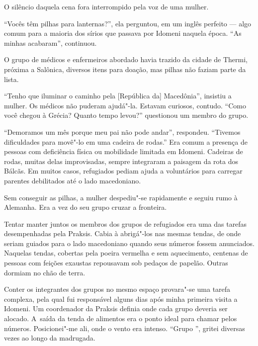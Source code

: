 
O silêncio daquela cena fora interrompido pela voz de uma mulher.

``Vocês têm pilhas para lanternas?'', ela perguntou, em um inglês
perfeito --- algo comum para a maioria dos sírios que passava por
Idomeni naquela época. ``As minhas acabaram'', continuou.

O grupo de médicos e enfermeiros abordado havia trazido da cidade de
Thermi, próxima a Salônica, diversos itens para doação, mas pilhas não faziam parte da lista.

``Tenho que iluminar o caminho pela {[}República da{]} Macedônia'',
insistiu a mulher. Os médicos não puderam ajudá"-la. Estavam curiosos,
contudo. ``Como você chegou à Grécia? Quanto tempo levou?'' questionou
um membro do grupo.

``Demoramos um mês porque meu pai não pode andar'', respondeu.
``Tivemos dificuldades para movê"-lo em uma cadeira de rodas.''
 Era comum a presença de pessoas com deficiência física ou mobilidade limitada em Idomeni.
 Cadeiras de rodas, muitas delas improvisadas, sempre integraram a paisagem da rota dos Bálcãs. Em muitos
casos, refugiados pediam ajuda a voluntários para carregar parentes
debilitados até o lado macedoniano.

Sem conseguir as pilhas, a mulher despediu"-se rapidamente e seguiu rumo
à Alemanha. Era a vez do seu grupo cruzar a fronteira.


Tentar manter juntos os membros dos grupos de refugiados era uma das
tarefas desempenhadas pela Praksis. Cabia à  abrigá"-los nas mesmas
tendas, de onde seriam guiados para o lado macedoniano quando seus
números fossem anunciados. Naquelas tendas, cobertas pela poeira
vermelha e sem aquecimento, centenas de pessoas com feições exaustas
repousavam sob pedaços de papelão. Outras dormiam no chão de terra.

Conter os integrantes dos grupos no mesmo espaço provara"-se uma tarefa
complexa, pela qual fui responsável alguns dias após minha primeira
visita a Idomeni. Um coordenador da Praksis definia onde cada grupo
deveria ser alocado. A~saída da tenda de alimentos era o ponto ideal
para chamar pelos números. Posicionei"-me ali, onde o vento era intenso. ``Grupo '', gritei diversas vezes
ao longo da madrugada.

